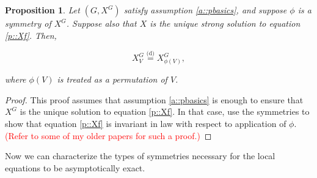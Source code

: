 \documentclass[12pt]{article}
\newcommand{\tr}{\textcolor{red}}
\newcommand{\deq}{\overset{\text{(d)}}{=}}			%
\newcommand{\Xf}{X}									%
\newcommand{\vind}[1]{_{#1}}						%
\newcommand{\gind}[1]{^{#1}}						%
\newtheorem{prop}[thms]{Proposition}
\begin{document}
\begin{prop}
Let \((G,\Xf\gind{G})\) satisfy assumption \ref{a::pbasics}, and suppose \(\phi\) is a symmetry of \(\Xf\gind{G}\). Suppose also that \(\Xf\) is the unique strong solution to equation \eqref{p::Xf}. Then,

\[\Xf\gind{G}\vind{V} \deq \Xf\gind{G}\vind{\phi(V)},\]

where \(\phi(V)\) is treated as a permutation of \(V\).
\label{a::simprop}
\end{prop}
\begin{proof}
This proof assumes that assumption \ref{a::pbasics} is enough to ensure that \(\Xf\gind{G}\) is the unique solution to equation \eqref{p::Xf}. In that case, use the symmetries to show that equation \eqref{p::Xf} is invariant in law with respect to application of \(\phi\). \tr{(Refer to some of my older papers for such a proof.)}
\end{proof}

Now we can characterize the types of symmetries necessary for the local equations to be asymptotically exact.
\end{document}
